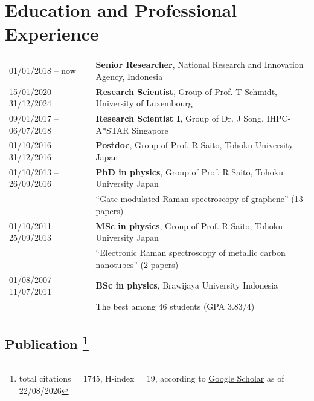 \section*{Education and Professional Experience}
 \vspace*{-\baselineskip}
\begin{table}[H]
  \begin{tabular}{ll}
  01/01/2018 -- now & {\bf Senior Researcher}, National Research and Innovation Agency, Indonesia \\
  15/01/2020 -- 31/12/2024 & {\bf Research Scientist}, Group of Prof. T Schmidt, University of Luxembourg  \\
  09/01/2017 -- 06/07/2018 & {\bf Research Scientist I}, Group of Dr. J Song, IHPC-A*STAR Singapore \\
  01/10/2016 -- 31/12/2016 & {\bf Postdoc}, Group of Prof. R Saito, Tohoku University Japan  \\
  01/10/2013 -- 26/09/2016 & {\bf PhD in physics}, Group of Prof. R Saito, Tohoku University Japan\\
  & ``Gate modulated Raman spectroscopy of graphene'' (13 papers)\\
  01/10/2011 -- 25/09/2013 & {\bf MSc in physics}, Group of Prof. R Saito, Tohoku University Japan\\
  & ``Electronic Raman spectroscopy of metallic carbon nanotubes'' (2 papers)\\
  01/08/2007 -- 11/07/2011 & {\bf BSc in physics}, Brawijaya University Indonesia\\
  & The best among 46 students (GPA 3.83/4)
\end {tabular}
\end {table}

\subsection*{Publication \footnote{total citations = 1745, H-index = 19, according to \href{https://scholar.google.co.jp/citations?user=v7UHy9cAAAAJ&hl=en}{Google Scholar} as of 22/08/2026}  }
